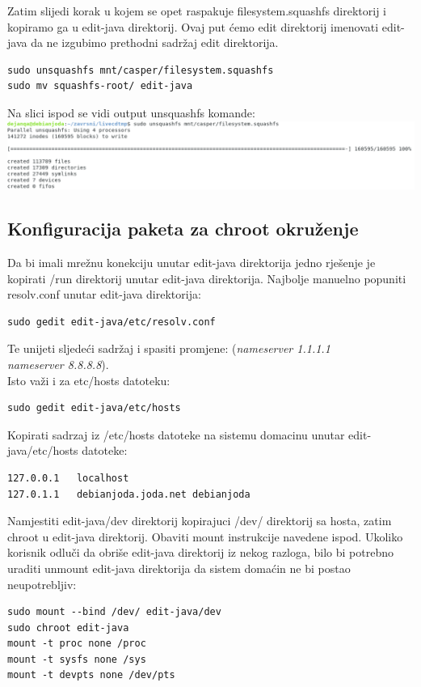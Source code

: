 \documentclass[12pt,vi]{mitthesis}
\begin{document}
Zatim slijedi korak u kojem se opet raspakuje filesystem.squashfs direktorij i kopiramo ga u edit-java direktorij. Ovaj put ćemo edit direktorij imenovati edit-java da ne izgubimo prethodni sadržaj edit direktorija.\\
\begin{lstlisting}[style=BashInputStyle]
sudo unsquashfs mnt/casper/filesystem.squashfs
sudo mv squashfs-root/ edit-java
\end{lstlisting}
Na slici ispod se vidi output unsquashfs komande:\\
\includegraphics[width=\linewidth]{images/unsquashfscommand.png} 

\subsection*{Konfiguracija paketa za chroot okruženje}
\noindent
Da bi imali mrežnu konekciju unutar edit-java direktorija jedno rješenje je kopirati /run direktorij unutar edit-java direktorija.
Najbolje manuelno popuniti resolv.conf unutar edit-java direktorija:
\begin{lstlisting}[style=BashInputStyle]
sudo gedit edit-java/etc/resolv.conf
\end{lstlisting}
Te unijeti sljedeći sadržaj i spasiti promjene:
(\textit{nameserver 1.1.1.1 \\
nameserver 8.8.8.8}).\\
\noindent
Isto važi i za etc/hosts datoteku:
\begin{lstlisting}[style=BashInputStyle]
sudo gedit edit-java/etc/hosts
\end{lstlisting}
Kopirati sadrzaj iz /etc/hosts datoteke na sistemu domacinu unutar edit-java/etc/hosts datoteke:
\begin{lstlisting}
127.0.0.1	localhost
127.0.1.1	debianjoda.joda.net	debianjoda
\end{lstlisting}

\noindent
Namjestiti edit-java/dev direktorij kopirajuci /dev/ direktorij sa hosta, zatim chroot u edit-java direktorij.
Obaviti mount instrukcije navedene ispod. Ukoliko korisnik odluči da obriše edit-java direktorij iz nekog razloga,
bilo bi potrebno uraditi unmount edit-java direktorija da sistem domaćin ne bi postao neupotrebljiv:
\begin{lstlisting}[style=BashInputStyle]
sudo mount --bind /dev/ edit-java/dev
sudo chroot edit-java
mount -t proc none /proc
mount -t sysfs none /sys
mount -t devpts none /dev/pts
\end{lstlisting}
\end{document}
